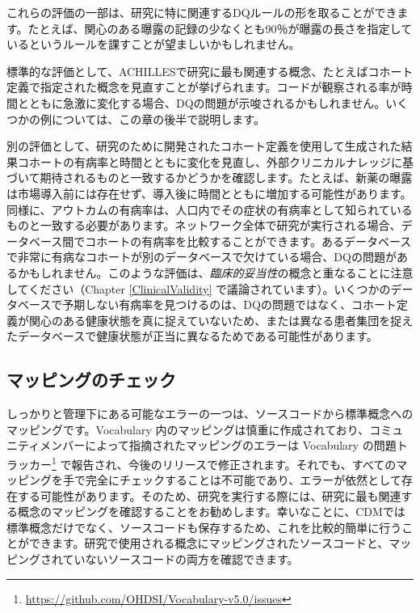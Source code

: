 \documentclass[
  11pt]{book}
\theoremstyle{definition}
\theoremstyle{definition}
\theoremstyle{definition}
\theoremstyle{definition}
\theoremstyle{remark}
\begin{document}
これらの評価の一部は、研究に特に関連するDQルールの形を取ることができます。たとえば、関心のある曝露の記録の少なくとも90％が曝露の長さを指定しているというルールを課すことが望ましいかもしれません。

標準的な評価として、ACHILLESで研究に最も関連する概念、たとえばコホート定義で指定された概念を見直すことが挙げられます。コードが観察される率が時間とともに急激に変化する場合、DQの問題が示唆されるかもしれません。いくつかの例については、この章の後半で説明します。

別の評価として、研究のために開発されたコホート定義を使用して生成された結果コホートの有病率と時間とともに変化を見直し、外部クリニカルナレッジに基づいて期待されるものと一致するかどうかを確認します。たとえば、新薬の曝露は市場導入前には存在せず、導入後に時間とともに増加する可能性があります。同様に、アウトカムの有病率は、人口内でその症状の有病率として知られているものと一致する必要があります。ネットワーク全体で研究が実行される場合、データベース間でコホートの有病率を比較することができます。あるデータベースで非常に有病なコホートが別のデータベースで欠けている場合、DQの問題があるかもしれません。このような評価は、\emph{臨床的妥当性}の概念と重なることに注意してください（Chapter \ref{ClinicalValidity} で議論されています）。いくつかのデータベースで予期しない有病率を見つけるのは、DQの問題ではなく、コホート定義が関心のある健康状態を真に捉えていないため、または異なる患者集団を捉えたデータベースで健康状態が正当に異なるためである可能性があります。

\subsection{マッピングのチェック}\label{ux30deux30c3ux30d4ux30f3ux30b0ux306eux30c1ux30a7ux30c3ux30af}

しっかりと管理下にある可能なエラーの一つは、ソースコードから標準概念へのマッピングです。Vocabulary 内のマッピングは慎重に作成されており、コミュニティメンバーによって指摘されたマッピングのエラーは Vocabulary の問題トラッカー\footnote{\url{https://github.com/OHDSI/Vocabulary-v5.0/issues}} で報告され、今後のリリースで修正されます。それでも、すべてのマッピングを手で完全にチェックすることは不可能であり、エラーが依然として存在する可能性があります。そのため、研究を実行する際には、研究に最も関連する概念のマッピングを確認することをお勧めします。幸いなことに、CDMでは標準概念だけでなく、ソースコードも保存するため、これを比較的簡単に行うことができます。研究で使用される概念にマッピングされたソースコードと、マッピングされていないソースコードの両方を確認できます。
\end{document}
